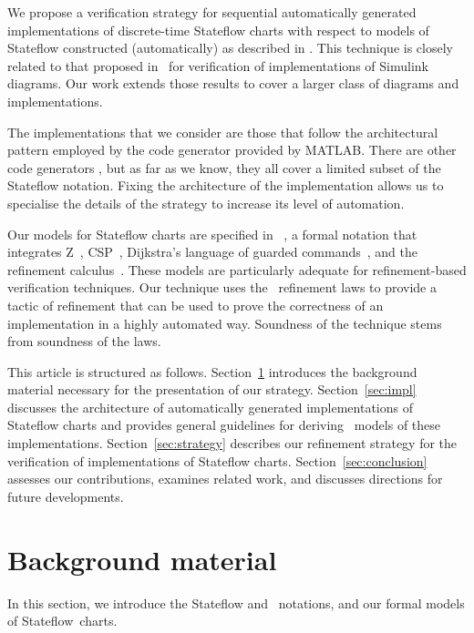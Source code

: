 \documentclass[submission]{eptcs}
\begin{document}
We propose a verification strategy for sequential automatically generated implementations of discrete-time Stateflow charts with respect to
models of Stateflow constructed (automatically) as described in \cite{Miyazawa2011a}. This technique is closely related to that
proposed in~\cite{Cavalcanti2011} for verification of implementations of Simulink diagrams. Our work extends those results
to cover a larger class of diagrams and implementations.

The implementations that we consider are those that follow the architectural pattern employed by the code generator provided
by MATLAB. There are other code generators \cite{Scaife2004,Toom2008}, but as far as we know, they all cover
a limited subset of the Stateflow notation. Fixing the architecture of the implementation allows us to specialise the details of the
strategy to increase its level of automation.

Our models for Stateflow charts are specified in \Circus~\cite{Woodcock2002}, a formal notation that integrates Z~\cite{Woodcock1996},
CSP~\cite{Roscoe1998}, Dijkstra's language of guarded commands~\cite{Dijkstra1975}, and the refinement calculus~\cite{Morgan1994}.
These models are particularly adequate for refinement-based verification techniques. Our technique uses the \Circus\ refinement laws to provide
a tactic of refinement that can be used to prove the correctness of an implementation in a highly automated way. Soundness of the technique
stems from soundness of the laws.

This article is structured as follows. Section~\ref{sec:background} introduces the background material necessary for the presentation of our strategy.
Section~\ref{sec:impl} discusses the architecture of automatically generated implementations of Stateflow charts and provides general guidelines for
deriving \Circus~models of these implementations. Section~\ref{sec:strategy} describes our refinement strategy for the verification of implementations
of Stateflow charts. Section~\ref{sec:conclusion} assesses our contributions, examines related work, and discusses directions for future developments.

\section{Background material}
\label{sec:background}

In this section, we introduce the Stateflow and \Circus~notations, and our formal models of Stateflow~charts.
\end{document}
